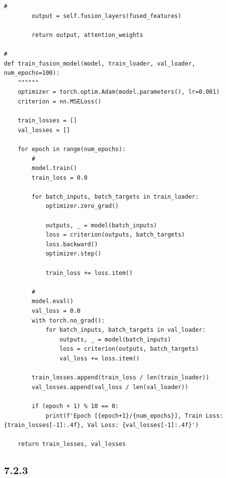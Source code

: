 \begin{lstlisting}[style=python]
        # 
        output = self.fusion_layers(fused_features)
        
        return output, attention_weights

# 
def train_fusion_model(model, train_loader, val_loader, num_epochs=100):
    """"""
    optimizer = torch.optim.Adam(model.parameters(), lr=0.001)
    criterion = nn.MSELoss()
    
    train_losses = []
    val_losses = []
    
    for epoch in range(num_epochs):
        # 
        model.train()
        train_loss = 0.0
        
        for batch_inputs, batch_targets in train_loader:
            optimizer.zero_grad()
            
            outputs, _ = model(batch_inputs)
            loss = criterion(outputs, batch_targets)
            loss.backward()
            optimizer.step()
            
            train_loss += loss.item()
        
        # 
        model.eval()
        val_loss = 0.0
        with torch.no_grad():
            for batch_inputs, batch_targets in val_loader:
                outputs, _ = model(batch_inputs)
                loss = criterion(outputs, batch_targets)
                val_loss += loss.item()
        
        train_losses.append(train_loss / len(train_loader))
        val_losses.append(val_loss / len(val_loader))
        
        if (epoch + 1) % 10 == 0:
            print(f'Epoch [{epoch+1}/{num_epochs}], Train Loss: {train_losses[-1]:.4f}, Val Loss: {val_losses[-1]:.4f}')
    
    return train_losses, val_losses
\end{lstlisting}

\hypertarget{section-99}{%
\subsection{7.2.3}\label{section-99}}

\hypertarget{section-100}{%
\subsubsection{}\label{section-100}}

